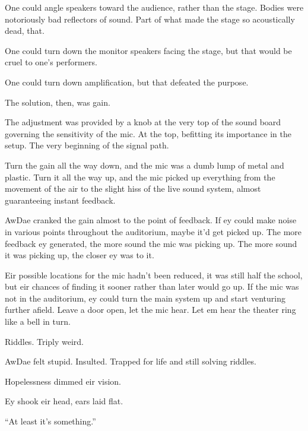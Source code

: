 One could angle speakers toward the audience, rather than the stage. Bodies were notoriously bad reflectors of sound. Part of what made the stage so acoustically dead, that.

One could turn down the monitor speakers facing the stage, but that would be cruel to one's performers.

One could turn down amplification, but that defeated the purpose.

The solution, then, was gain.

The adjustment was provided by a knob at the very top of the sound board governing the sensitivity of the mic. At the top, befitting its importance in the setup. The very beginning of the signal path.

Turn the gain all the way down, and the mic was a dumb lump of metal and plastic. Turn it all the way up, and the mic picked up everything from the movement of the air to the slight hiss of the live sound system, almost guaranteeing instant feedback.

AwDae cranked the gain almost to the point of feedback. If ey could make noise in various points throughout the auditorium, maybe it'd get picked up. The more feedback ey generated, the more sound the mic was picking up. The more sound it was picking up, the closer ey was to it.

Eir possible locations for the mic hadn't been reduced, it was still half the school, but eir chances of finding it sooner rather than later would go up. If the mic was not in the auditorium, ey could turn the main system up and start venturing further afield. Leave a door open, let the mic hear. Let em hear the theater ring like a bell in turn.

Riddles. Triply weird.

AwDae felt stupid. Insulted. Trapped for life and still solving riddles.

Hopelessness dimmed eir vision.

Ey shook eir head, ears laid flat.

``At least it's something.''
